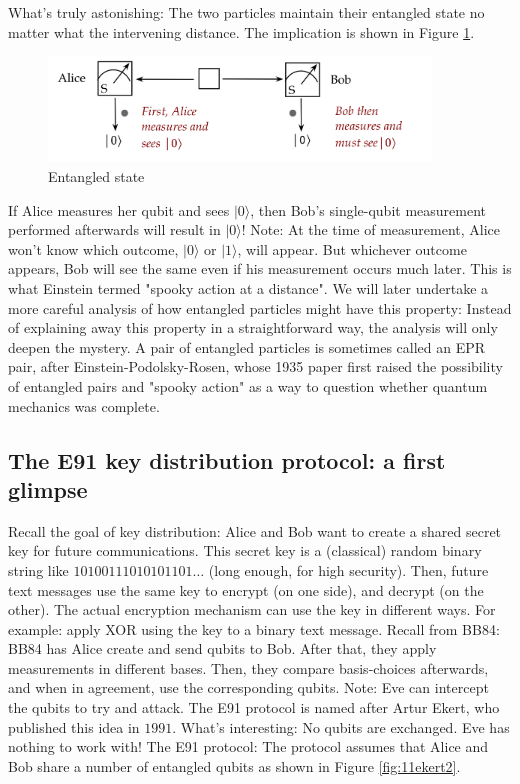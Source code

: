 \documentclass[main.tex]{subfiles}
\begin{document}
    What's truly astonishing: The two particles maintain their entangled state no matter what the intervening distance. The implication is shown in Figure \ref{fig:10entangle3}.
    
    \begin{figure}
        \centering
        \includegraphics[width=4in]{notes/figs/n06/10entangle3.png}
        \caption{Entangled state}
        \label{fig:10entangle3}
    \end{figure}
    
    If Alice measures her qubit and sees $|0\rangle$, then Bob's single-qubit measurement performed afterwards will result in $|0\rangle !$ Note: At the time of measurement, Alice won't know which outcome, $|0\rangle$ or $|1\rangle$, will appear. But whichever outcome appears, Bob will see the same even if his measurement occurs much later. This is what Einstein termed "spooky action at a distance". We will later undertake a more careful analysis of how entangled particles might have this property: Instead of explaining away this property in a straightforward way, the analysis will only deepen the mystery. A pair of entangled particles is sometimes called an EPR pair, after Einstein-Podolsky-Rosen, whose 1935 paper first raised the possibility of entangled pairs and "spooky action" as a way to question whether quantum mechanics was complete.
    
\subsection{The E91 key distribution protocol: a first glimpse}

    Recall the goal of key distribution: Alice and Bob want to create a shared secret key for future communications. This secret key is a (classical) random binary string like $10100111010101101 \ldots$ (long enough, for high security). Then, future text messages use the same key to encrypt (on one side), and decrypt (on the other). The actual encryption mechanism can use the key in different ways. For example: apply XOR using the key to a binary text message. Recall from BB84: BB84 has Alice create and send qubits to Bob. After that, they apply measurements in different bases. Then, they compare basis-choices afterwards, and when in agreement, use the corresponding qubits. Note: Eve can intercept the qubits to try and attack. The E91 protocol is named after Artur Ekert, who published this idea in $1991$. What's interesting: No qubits are exchanged. Eve has nothing to work with! The E91 protocol: The protocol assumes that Alice and Bob share a number of entangled qubits as shown in Figure \ref{fig:11ekert2}.
    
\end{document}
